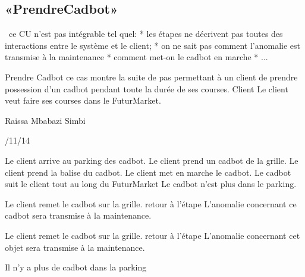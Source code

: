 \subsection{«PrendreCadbot»}
\TODO\ ce CU n'est pas intégrable tel quel: 
* les étapes ne décrivent pas toutes des interactions entre le système et le client; 
* on ne sait pas comment l'anomalie est transmise à la maintenance 
* comment met-on le cadbot en marche
* ...

\startCU
\nom Prendre Cadbot
\but  ce cas montre la suite de pas permettant à un client de prendre possession d'un cadbot pendant toute la durée de ses courses.
\acteur Client
\precondition Le client veut faire ses courses dans le FuturMarket.

\auteur Raissa Mbabazi Simbi
\date 7/11/14

\nominal %
\startnominal
\etape[SA1] Le client arrive au parking des cadbot. 
\etape[RETOUR] 	Le client prend un cadbot de la grille.
\etape[SE1] Le client prend la balise du cadbot.
\etape Le client met en marche le cadbot.
\etape Le cadbot suit le client tout au long du FuturMarket
\stopnominal
\postcondition Le cadbot n'est plus dans le parking.

\alternatifs
\startalternatif[SA1] %
  \etape Le client remet le cadbot sur la grille.
  \etape retour à l'étape \in[RETOUR]
\stopcondition
\postcondition L'anomalie concernant ce cadbot sera transmise à la maintenance.
\stopalternatif

\startalternatif[SE1]
   \etape  Le client remet le cadbot sur la grille.
  \etape retour à l'étape \in[RETOUR]
\stopcondition
\postcondition L'anomalie concernant cet objet sera transmise à la maintenance.
\stopalternatif


\exception
Il n'y a plus de cadbot dans la parking
\stopCU
